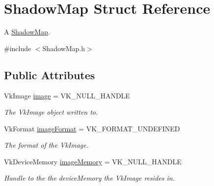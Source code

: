 \hypertarget{struct_shadow_map}{}\section{Shadow\+Map Struct Reference}
\label{struct_shadow_map}


A \mbox{\hyperlink{struct_shadow_map}{Shadow\+Map}}.  




{\ttfamily \#include $<$Shadow\+Map.\+h$>$}

\subsection*{Public Attributes}
\begin{DoxyCompactItemize}
\item 
\mbox{\label{struct_shadow_map_ac55c9389b8d15ab2a556f081a9164beb}} 
Vk\+Image \mbox{\hyperlink{struct_shadow_map_ac55c9389b8d15ab2a556f081a9164beb}{image}} = V\+K\+\_\+\+N\+U\+L\+L\+\_\+\+H\+A\+N\+D\+LE
\begin{DoxyCompactList}\small\item\em The Vk\+Image object written to. \end{DoxyCompactList}\item 
\mbox{\label{struct_shadow_map_a7544c967e388df10aa6b0df76d88beb9}} 
Vk\+Format \mbox{\hyperlink{struct_shadow_map_a7544c967e388df10aa6b0df76d88beb9}{image\+Format}} = V\+K\+\_\+\+F\+O\+R\+M\+A\+T\+\_\+\+U\+N\+D\+E\+F\+I\+N\+ED
\begin{DoxyCompactList}\small\item\em The format of the Vk\+Image. \end{DoxyCompactList}\item 
\mbox{\label{struct_shadow_map_af62c81ce6645222d0006bf8a332214f3}} 
Vk\+Device\+Memory \mbox{\hyperlink{struct_shadow_map_af62c81ce6645222d0006bf8a332214f3}{image\+Memory}} = V\+K\+\_\+\+N\+U\+L\+L\+\_\+\+H\+A\+N\+D\+LE
\begin{DoxyCompactList}\small\item\em Handle to the the device\+Memory the Vk\+Image resides in. \end{DoxyCompactList}\item 
\mbox{\label{struct_shadow_map_ad7e6e3c82f63f39a518232232058c4bd}} 

\end{DoxyCompactItemize}
